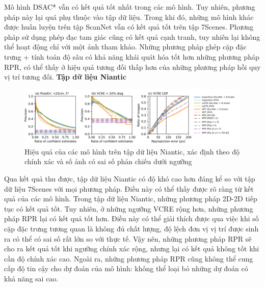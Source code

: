 Mô hình DSAC* vẫn có kết quả tốt nhất trong các mô hình. Tuy nhiên, phương pháp này lại quá phụ thuộc vào tập dữ liệu. Trong khi đó, những mô hình khác được huấn luyện trên tập ScanNet vẫn có kết quả tốt trên tập 7Scenes. Phương pháp sử dụng phép đạc tam giác cũng có kết quả cạnh tranh, tuy nhiên lại không thể hoạt động chỉ với một ảnh tham khảo. Những phương pháp ghép cặp đặc trưng + tính toán độ sâu có khả năng khái quát hóa tốt hơn những phương pháp RPR, có thể thấy ở hiệu quả tương đối thấp hơn của những phương pháp hồi quy vị trí tương đối.
\newpage
\textbf{Tập dữ liệu Niantic \cite{arnold2022mapfree}}

\begin{figure}[H]
  \centering
  \includegraphics[scale=0.75]{pics/Proposal/all_niantic.png}
  \caption{Hiệu quả của các mô hình trên tập dữ liệu Niantic, xác định theo độ chính xác và số ảnh có sai số phản chiếu dưới ngưỡng}
\end{figure}

Qua kết quả thu được, tập dữ liệu Niantic có độ khó cao hơn đáng kể so với tập dữ liệu 7Scenes với mọi phương pháp. Điều này có thể thấy được rõ ràng từ kết quả của các mô hình. Trong tập dữ liệu Niantic, những phương pháp 2D-2D tiếp tục có kết quả tốt. Tuy nhiên, ở những ngưỡng VCRE rộng hơn, những phương pháp RPR lại có kết quả tốt hơn. Điều này có thể giải thích được qua việc khi số cặp đặc trưng tương quan là không đủ chất lượng, độ lệch đơn vị vị trí được sinh ra có thể có sai số rất lớn so với thực tế. Vậy nên, những phương pháp RPR sẽ cho ra kết quả tốt khi ngưỡng chính xác rộng, nhưng lại có kết quả không tốt khi cần độ chính xác cao. Ngoài ra, những phương pháp RPR cũng không thể cung cấp độ tin cậy cho dự đoán của mô hình: không thể loại bỏ những dự đoán có khả năng sai cao.
